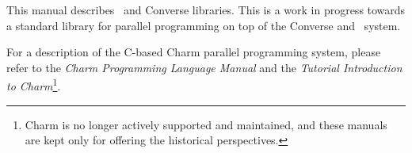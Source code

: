 This manual describes \charmpp\ and Converse libraries.\cite{InterOpIPPS96}
This is a work in progress towards a standard library for parallel
programming on top of the Converse and \charmpp\ system.

For a description of the C-based {\sc Charm} parallel programming system,
please refer to the {\sl Charm Programming Language Manual} and the
{\sl Tutorial Introduction to Charm}\footnote{{\sc Charm} is no longer
actively supported and maintained, and these manuals are kept only for
offering the historical perspectives.}.
